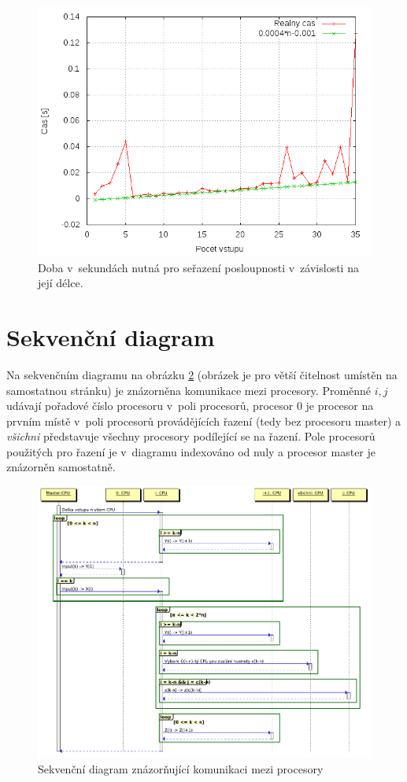 \documentclass[a4paper, 12pt]{article}
\begin{document}
\begin{figure}[bt]
\begin{center}
\includegraphics[scale=0.8]{plots/perf.png}
\caption{Doba v~sekundách nutná pro seřazení posloupnosti v~závislosti na její délce.}
\label{fig:exp}
\end{center}
\end{figure}

\section{Sekvenční diagram}
\label{sec:seq}
Na sekvenčním diagramu na obrázku \ref{fig:seq} (obrázek je pro větší čitelnost umístěn na samostatnou stránku)
je znázorněna komunikace mezi procesory.
Proměnné $i,j$ udávají pořadové číslo procesoru v~poli procesorů,
procesor $0$ je procesor na prvním místě v~poli procesorů provádějících řazení (tedy bez procesoru master)
a \emph{všichni} představuje všechny procesory podílející se na řazení.
Pole procesorů použitých pro řazení je v~diagramu indexováno od nuly a procesor master je znázorněn samostatně.
\begin{figure}
\includegraphics[scale=0.7]{seq.png}
\caption{Sekvenční diagram znázorňující komunikaci mezi procesory}
\label{fig:seq}
\end{figure}
\end{document}
